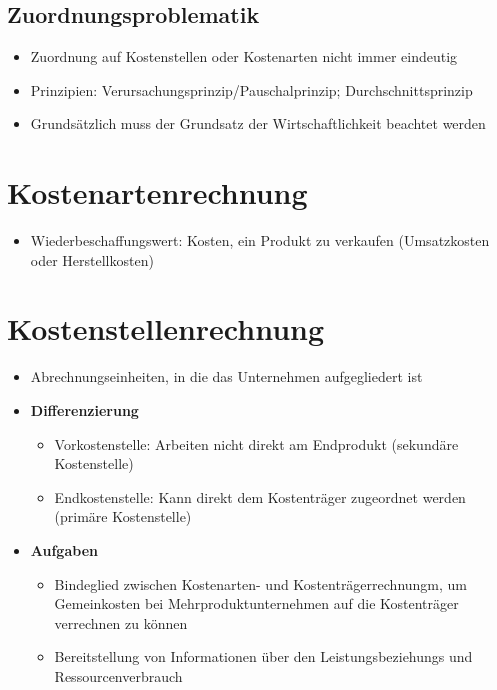 \subsection{Zuordnungsproblematik}
\begin{itemize}
	\item Zuordnung auf Kostenstellen oder Kostenarten nicht immer eindeutig
	\item Prinzipien: Verursachungsprinzip/Pauschalprinzip; Durchschnittsprinzip
	\item Grundsätzlich muss der Grundsatz der Wirtschaftlichkeit beachtet werden
\end{itemize}



\section{Kostenartenrechnung}
\begin{itemize}
	\item Wiederbeschaffungswert: Kosten, ein Produkt zu verkaufen (Umsatzkosten oder Herstellkosten)
\end{itemize}



\section{Kostenstellenrechnung}
\begin{itemize}
	\item Abrechnungseinheiten, in die das Unternehmen aufgegliedert ist
	\item \textbf{Differenzierung}
	\begin{itemize}
		\item Vorkostenstelle: Arbeiten nicht direkt am Endprodukt (sekundäre Kostenstelle)
		\item Endkostenstelle: Kann direkt dem Kostenträger zugeordnet werden (primäre Kostenstelle)
	\end{itemize}
	\item \textbf{Aufgaben}
	\begin{itemize}
		\item Bindeglied zwischen Kostenarten- und Kostenträgerrechnungm, um Gemeinkosten bei Mehrproduktunternehmen auf die Kostenträger verrechnen zu können
		\item Bereitstellung von Informationen über den Leistungsbeziehungs und Ressourcenverbrauch
	\end{itemize}
\end{itemize}


